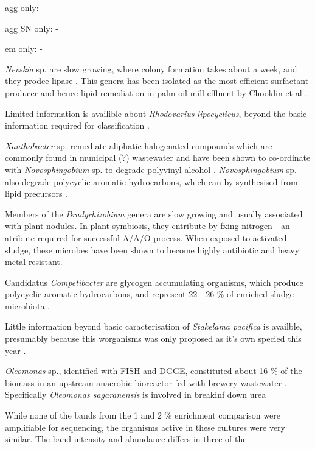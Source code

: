 \documentclass[11pt]{article}
\begin{document}
agg only:
-

agg SN only:
- 

em only:
-

\emph{Nevskia} sp. are slow growing, where colony formation takes about a week, and they prodce lipase \cite{kim2011nevskia}. This genera has been isolated as the most efficient surfactant producer and hence lipid remediation in palm oil mill effluent by Chooklin et al \cite{chooklinutilization}.



Limited information is availible about \emph{Rhodovarius lipocyclicus}, beyond the basic information required for classification \cite{kampfer2004rhodovarius}.

\emph{Xanthobacter} sp. remediate aliphatic halogenated compounds which are commonly found in municipal (?) wastewater \cite{janssen1985degradation} and have been shown to co-ordinate with \emph{Novosphingobium} sp. to degrade polyvinyl alcohol \cite{rong2009symbiotic}. \emph{Novosphingobium} sp. also degrade polycyclic aromatic hydrocarbons, which can by synthesised from lipid precursors \cite{addison2007novosphingobium}.

Members of the \emph{Bradyrhizobium} genera are slow growing \cite{rebah2002wastewater} and usually associated with plant nodules. In plant symbiosis, they cntribute by fxing nitrogen - an atribute required for successful A/A/O process. When exposed to activated sludge, these microbes have been shown to become highly antibiotic and heavy metal resistant.

Candidatus \emph{Competibacter} are glycogen accumulating organisms, which produce polycyclic aromatic hydrocarbons, and represent 22 - 26 \% of enriched sludge microbiota \cite{bengtsson2008production,lemaire2008microbial}. 

Little information beyond basic caracterisation of \emph{Stakelama pacifica} is availble, presumably because this worganisms was only proposed as it's own specied this year \cite{ogler2013description}.

\emph{Oleomonas} sp., identified with FISH and DGGE, constituted about 16 \% of the biomass in an upstream anaerobic bioreactor fed with brewery wastewater \cite{fernandez2008analysis}. Specifically \emph{Oleomonas sagaranensis} is involved in breakinf down urea \cite{kanamori2005allophanate,kanamori2004enzymatic}



While none of the bands from the 1 and 2 \% enrichment comparison were amplifiable for sequencing, the organisms active in these cultures were very similar. The band intensity and abundance differs in three of the 
\end{document}
